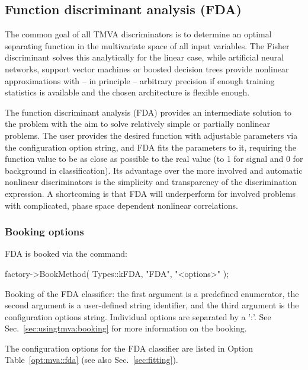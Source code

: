 \subsection{Function discriminant analysis (FDA)}
\label{sec:fda}

The common goal of all TMVA discriminators is to determine an optimal separating
function in the multivariate space of all input variables. The Fisher 
discriminant solves this analytically for the linear case, while artificial neural
networks, support vector machines or boosted decision trees provide nonlinear 
approximations with -- in principle -- arbitrary precision if enough training 
statistics is available and the chosen architecture is flexible enough. 

The function discriminant analysis (FDA) provides an intermediate solution to the 
problem with the aim to solve relatively simple or partially nonlinear problems. 
The user provides the desired function with adjustable parameters via the configuration 
option string, and FDA fits the parameters to it, requiring the function value to be as 
close as possible to the real value (to 1 for signal and 0 for background in classification).
Its advantage over the more involved and automatic nonlinear discriminators is the simplicity 
and transparency of the discrimination expression. A shortcoming is that FDA will underperform 
for involved problems with complicated, phase space dependent nonlinear correlations.

\subsubsection{Booking options}

FDA is booked via the command:
\begin{codeexample}
\begin{tmvacode}
factory->BookMethod( Types::kFDA, "FDA", "<options>" );
\end{tmvacode}
\caption[.]{\codeexampleCaptionSize Booking of the FDA classifier: the first argument is 
		   a predefined enumerator, the second argument is a user-defined 
		   string identifier, and the third argument is the configuration options string.
         Individual options are separated by a ':'. 
         See Sec.~\ref{sec:usingtmva:booking} for more information on the booking.}
\end{codeexample}

The configuration options for the FDA classifier are listed in Option Table~\ref{opt:mva::fda}
(see also Sec.~\ref{sec:fitting}).


